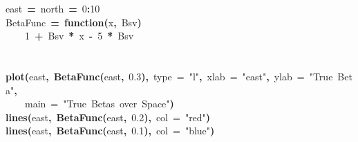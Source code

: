 \documentclass{article}
\makeatletter
\newcommand{\hlnumber}[1]{\textcolor[rgb]{0,0,0}{#1}}%
\newcommand{\hlfunctioncall}[1]{\textcolor[rgb]{0.501960784313725,0,0.329411764705882}{\textbf{#1}}}%
\newcommand{\hlstring}[1]{\textcolor[rgb]{0.6,0.6,1}{#1}}%
\newcommand{\hlkeyword}[1]{\textcolor[rgb]{0,0,0}{\textbf{#1}}}%
\newcommand{\hlargument}[1]{\textcolor[rgb]{0.690196078431373,0.250980392156863,0.0196078431372549}{#1}}%
\newcommand{\hlformalargs}[1]{\textcolor[rgb]{0.690196078431373,0.250980392156863,0.0196078431372549}{#1}}%
\newcommand{\hlassignement}[1]{\textcolor[rgb]{0,0,0}{\textbf{#1}}}%
\newcommand{\hlsymbol}[1]{\textcolor[rgb]{0,0,0}{#1}}%
\newcommand{\hlstd}[1]{\textcolor[rgb]{0,0,0}{#1}}%
\newenvironment{kframe}{%
 \def\FrameCommand##1{\hskip\@totalleftmargin \hskip-\fboxsep
 \colorbox{shadecolor}{##1}\hskip-\fboxsep
     \hskip-\linewidth \hskip-\@totalleftmargin \hskip\columnwidth}%
 \MakeFramed {\advance\hsize-\width
   \@totalleftmargin\z@ \linewidth\hsize
   \@setminipage}}%
 {\par\unskip\endMakeFramed}
\newenvironment{knitrout}{}{} %
\makeatother
\begin{document}
\begin{knitrout}
\color{fgcolor}\begin{kframe}
\begin{flushleft}
\ttfamily\noindent
\hlsymbol{east}{\ }\hlassignement{=}{\ }\hlsymbol{north}{\ }\hlassignement{=}{\ }\hlnumber{0}\hlkeyword{:}\hlnumber{10}\hspace*{\fill}\\
\hlstd{}\hlsymbol{BetaFunc}{\ }\hlassignement{=}{\ }\hlkeyword{function}\hlkeyword{(}\hlformalargs{x}\hlkeyword{,}{\ }\hlformalargs{Bsv}\hlkeyword{)}{\ }\hlkeyword{\usebox{\hlnormalsizeboxopenbrace}}\hspace*{\fill}\\
\hlstd{}{\ }{\ }{\ }{\ }\hlnumber{1}{\ }\hlkeyword{+}{\ }\hlsymbol{Bsv}{\ }\hlkeyword{*}{\ }\hlsymbol{x}{\ }\hlkeyword{-}{\ }\hlnumber{5}{\ }\hlkeyword{*}{\ }\hlsymbol{Bsv}\hspace*{\fill}\\
\hlstd{}\hlkeyword{\usebox{\hlnormalsizeboxclosebrace}}\hspace*{\fill}\\
\hlstd{}\hspace*{\fill}\\
\hlstd{}\hlfunctioncall{plot}\hlkeyword{(}\hlsymbol{east}\hlkeyword{,}{\ }\hlfunctioncall{BetaFunc}\hlkeyword{(}\hlsymbol{east}\hlkeyword{,}{\ }\hlnumber{0.3}\hlkeyword{)}\hlkeyword{,}{\ }\hlargument{type}{\ }\hlargument{=}{\ }\hlstring{"{}l"{}}\hlkeyword{,}{\ }\hlargument{xlab}{\ }\hlargument{=}{\ }\hlstring{"{}east"{}}\hlkeyword{,}{\ }\hlargument{ylab}{\ }\hlargument{=}{\ }\hlstring{"{}True{\ }Beta"{}}\hlkeyword{,}\hspace*{\fill}\\
\hlstd{}{\ }{\ }{\ }{\ }\hlargument{main}{\ }\hlargument{=}{\ }\hlstring{"{}True{\ }Betas{\ }over{\ }Space"{}}\hlkeyword{)}\hspace*{\fill}\\
\hlstd{}\hlfunctioncall{lines}\hlkeyword{(}\hlsymbol{east}\hlkeyword{,}{\ }\hlfunctioncall{BetaFunc}\hlkeyword{(}\hlsymbol{east}\hlkeyword{,}{\ }\hlnumber{0.2}\hlkeyword{)}\hlkeyword{,}{\ }\hlargument{col}{\ }\hlargument{=}{\ }\hlstring{"{}red"{}}\hlkeyword{)}\hspace*{\fill}\\
\hlstd{}\hlfunctioncall{lines}\hlkeyword{(}\hlsymbol{east}\hlkeyword{,}{\ }\hlfunctioncall{BetaFunc}\hlkeyword{(}\hlsymbol{east}\hlkeyword{,}{\ }\hlnumber{0.1}\hlkeyword{)}\hlkeyword{,}{\ }\hlargument{col}{\ }\hlargument{=}{\ }\hlstring{"{}blue"{}}\hlkeyword{)}\hspace*{\fill}\\

\end{flushleft}
\end{kframe}
\end{knitrout}
\end{document}
